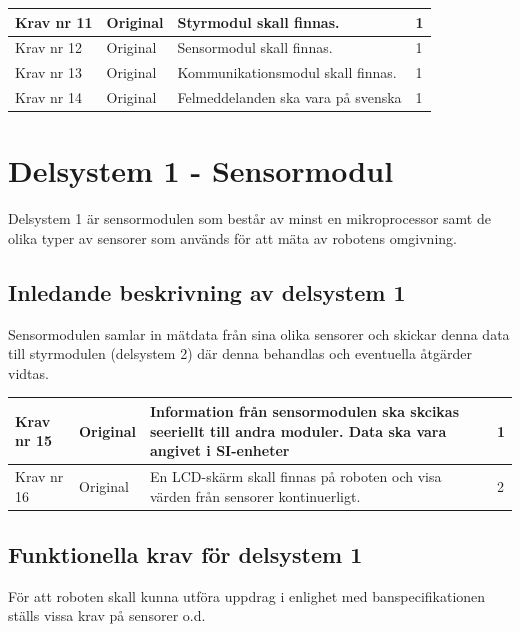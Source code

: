 \documentclass[11pt]{article}
\begin{document}
\begin{flushleft}
\begin{center}
\begin{longtable}{|l|l|p{.70\linewidth}|l|}
Krav nr 11 &
Original &
Styrmodul skall finnas. &
1 \\ \hline

Krav nr 12 &
Original &
Sensormodul skall finnas. &
1 \\ \hline

Krav nr 13 &
Original &
Kommunikationsmodul skall finnas. &
1 \\ \hline

Krav nr 14 &
Original &
Felmeddelanden ska vara på svenska &
1 \\ \hline
\end{longtable}
\end{center}

\pagebreak

\section{Delsystem 1 - Sensormodul}
Delsystem 1 är sensormodulen som består av minst en mikroprocessor samt de olika typer av sensorer som används för att mäta av robotens omgivning.


\subsection{Inledande beskrivning av delsystem 1}
Sensormodulen samlar in mätdata från sina olika sensorer och skickar denna data till styrmodulen (delsystem 2) där denna behandlas och eventuella åtgärder vidtas.

\begin{center}
\begin{longtable}{|l|l|p{.70\linewidth}|l|} \hline


Krav nr 15 & 
Original &
Information från sensormodulen ska skcikas seeriellt till andra moduler. Data ska vara angivet i SI-enheter &
1 \\ \hline

Krav nr 16 &
Original &
En LCD-skärm skall finnas på roboten och visa värden från sensorer kontinuerligt. &
2 \\ \hline

\end{longtable}
\end{center}

\subsection{Funktionella krav för delsystem 1}
För att roboten skall kunna utföra uppdrag i enlighet med banspecifikationen ställs vissa krav på sensorer o.d.


\end{flushleft}
\end{document}
